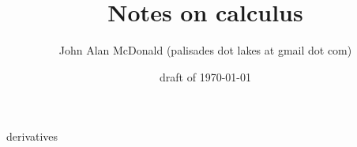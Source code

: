 \documentclass{PalisadesLakesBook}
\title{Notes on calculus}
\author{John Alan McDonald 
(palisades dot lakes at gmail dot com)}
\date{draft of \today}
\begin{document}
\maketitle
\PalisadesLakesTableOfContents
\def\sharedFolder{../../shared/}
{derivatives}
\end{document}
